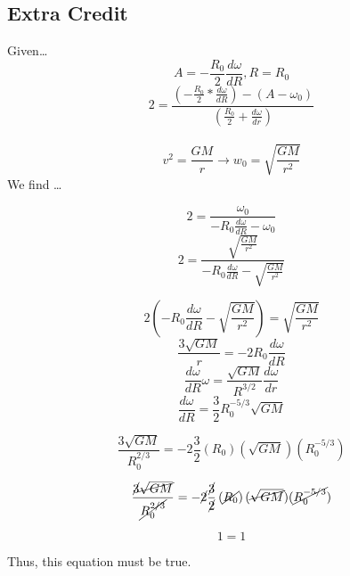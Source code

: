 \documentclass{article}
\begin{document}
\subsection{Extra Credit}
Given\dots
\[A = - \frac{R_0}{2}\frac{d\omega}{dR}, R = R_0\]
\[2 = \frac{(-\frac{R_0}{2} * \frac{d\omega}{dR}) -(A-\omega_0)}{(\frac{R_0}{2} + \frac{d\omega}{dr})}\]\
\[v^2 = \frac{GM}{r} \rightarrow w_0 =  \sqrt{\frac{GM}{r^2}}\]
We find \dots

\[2 = \frac{\omega_0}{-R_0 \frac{d\omega}{dR} -\omega_0}\]
\[2 = \frac{\sqrt{\frac{GM}{r^2}}}{-R_0 \frac{d\omega}{dR} -\sqrt{\frac{GM}{r^2}}}\]

\[2(-R_0 \frac{d\omega}{dR} -\sqrt{\frac{GM}{r^2}})= \sqrt{\frac{GM}{r^2}}\]
\[\frac{3\sqrt{GM}}{r} = -2R_0 \frac{d\omega}{dR}\]
\[\frac{d\omega}{dR} \omega = \frac{\sqrt{GM}}{R^{3/2}}\frac{d\omega}{dr}\]
\[\frac{d\omega}{dR} = \frac{3}{2} R_0^{-5/3}\sqrt{GM}\]

\[\frac{3\sqrt{GM}}{R_0^{2/3}} = -2\frac{3}{2}\left(R_0\right)(\sqrt{GM}) (R_0^{-5/3})\]

\[\frac{\cancel{3}\cancel{\sqrt{GM}}}{\cancel{R_0^{2/3}}} = -\cancel{2}\frac{\cancel{3}}{\cancel{2}}\left(\cancel{R_0}\right)(\cancel{\sqrt{GM}}) (\cancel{R_0^{-5/3}})\]

\[1 = 1\]

Thus, this equation must be true.
\end{document}

